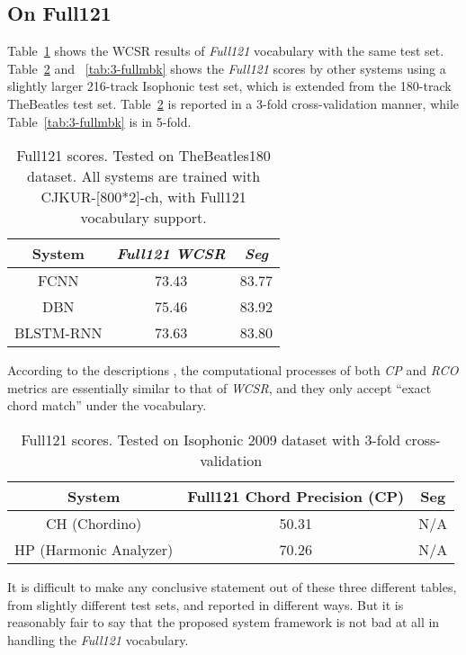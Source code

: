 \subsection{On Full121}
Table~\ref{tab:3-full} shows the WCSR results of \textit{Full121} vocabulary with the same test set. Table~\ref{tab:3-fullhp} and ~\ref{tab:3-fullmbk} shows the \textit{Full121} scores by other systems using a slightly larger 216-track Isophonic test set, which is extended from the 180-track TheBeatles test set. Table~\ref{tab:3-fullhp} is reported in a 3-fold cross-validation manner, while Table~\ref{tab:3-fullmbk} is in 5-fold.
\begin{table}[h]
\footnotesize
\centering
\caption{Full121 scores. Tested on TheBeatles180 dataset. All systems are trained with CJKUR-[800*2]-ch, with Full121 vocabulary support.}
\label{tab:3-full}
\begin{tabular}{|c|c|c|}\hline
System & \textit{Full121} \textit{WCSR} & \textit{Seg} \\ \hline
FCNN & 73.43 & 83.77 \\ \hline
DBN & 75.46 & 83.92 \\ \hline
BLSTM-RNN & 73.63 & 83.80 \\ \hline
\end{tabular}
\end{table}

According to the descriptions \cite{ni2012end,mauch2010automatic}, the computational processes of both \textit{CP} and \textit{RCO} metrics are essentially similar to that of \textit{WCSR}, and they only accept ``exact chord match'' under the vocabulary.
\begin{table}[h]
\footnotesize
\centering
\caption{Full121 scores. Tested on Isophonic 2009 dataset with 3-fold cross-validation\cite{ni2012end}}
\label{tab:3-fullhp}
\begin{tabular}{|c|c|c|}\hline
System & Full121 Chord Precision (CP) & Seg \\ \hline
CH (Chordino) & 50.31 & N/A \\ \hline
HP (Harmonic Analyzer) & 70.26 & N/A\\ \hline
\end{tabular}
\end{table}

It is difficult to make any conclusive statement out of these three different tables, from slightly different test sets, and reported in different ways. But it is reasonably fair to say that the proposed system framework is not bad at all in handling the \textit{Full121} vocabulary.

